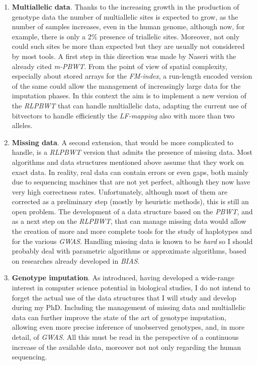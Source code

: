 \documentclass[a4paper,11pt, oneside]{article}
\begin{document}
\begin{enumerate}[leftmargin=.2in]
  \setlength\itemsep{-0.2em}
  \item \textbf{Multiallelic data}. Thanks to the increasing growth in the
  production of genotype data the number of multiallelic sites is expected to
  grow, as the number of samples increases, even in the human
  genome, although now, for example, there is only a 2\% presence of triallelic
  sites. Moreover, not only could such sites be more than expected but they are
  usually not considered by most tools. A first step in this direction was made
  by Naseri with the already cited \textit{m-PBWT}. From the point of view of
  spatial complexity, especially about stored arrays for the \textit{FM-index},
  a run-length encoded version of the same could 
  allow the management of increasingly large data for the imputation phases. 
  In this context the aim is to implement a new 
  version of the \textit{RLPBWT} that can handle multiallelic data, adapting the
  current use of bitvectors to handle efficiently the \textit{LF-mapping} also
  with more than two alleles. 
  \item \textbf{Missing data}. A second extension, that would be more
  complicated to 
  handle, is a \textit{RLPBWT} version that admits the presence of
  missing data. Most algorithms and data structures mentioned above assume that
  they work on exact data. In reality, real data can contain errors or even
  gaps, both mainly due to sequencing machines that are not yet perfect,
  although they now have very high correctness rates. Unfortunately, although 
  most of them are corrected as a preliminary step (mostly by heuristic
  methods), this is still an open problem. The development of a data structure
  based on the \textit{PBWT}, and as a next step on the \textit{RLPBWT}, that
  can manage missing data would allow the 
  creation of more and more complete tools for the study of haplotypes and for
  the various \textit{GWAS}. 
  Handling missing data is known to be \textit{hard} so I should
  probably deal with parametric algorithms or approximate algorithms, based on
  researches already developed in \textit{BIAS}.
  \item \textbf{Genotype imputation}. As introduced, having developed a
  wide-range interest in computer science potential in biological studies, I do
  not intend to forget the actual use of the data structures that I will study
  and develop during my PhD. Including the management of missing data and
  multiallelic data can further improve the state of the art of genotype
  imputation, allowing even more precise inference of unobserved genotypes, and,
  in more detail, of \textit{GWAS}. All this must be read in the perspective of
  a continuous increase of the available data, moreover not not only regarding
  the human sequencing.  
\end{enumerate}
\end{document}
